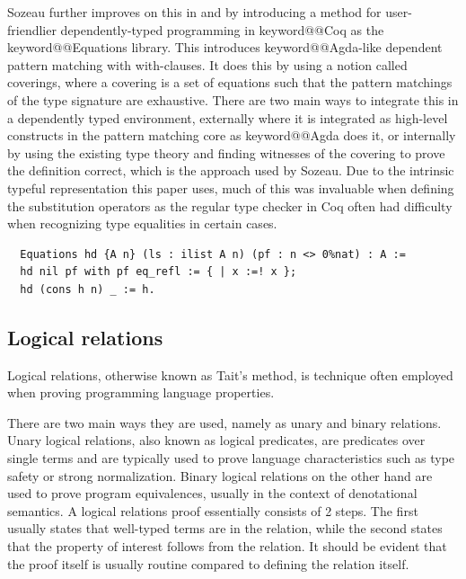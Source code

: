 \documentclass[12pt, final]{article}
\makeatletter
\def\<#1>{\csname keyword@@#1\endcsname}
\makeatother
\begin{document}
Sozeau further improves on this in \cite{Sozeau2010} and \cite{Sozeau2019} by introducing a method for user-friendlier dependently-typed programming in \<Coq> as the \<Equations> library.
This introduces \<Agda>-like dependent pattern matching with with-clauses.
It does this by using a notion called coverings, where a covering is a set of equations such that the pattern matchings of the type signature are exhaustive.
There are two main ways to integrate this in a dependently typed environment, externally where it is integrated as high-level constructs in the pattern matching core as \<Agda> does it, or internally by using the existing type theory and finding witnesses of the covering to prove the definition correct, which is the approach used by Sozeau.
Due to the intrinsic typeful representation this paper uses, much of this was invaluable when defining the substitution operators as the regular type checker in Coq often had difficulty when recognizing type equalities in certain cases.

\begin{listing}
  \begin{verbatim}
  Equations hd {A n} (ls : ilist A n) (pf : n <> 0%nat) : A :=
  hd nil pf with pf eq_refl := { | x :=! x };
  hd (cons h n) _ := h.
  \end{verbatim}
  \caption{Definition of hd using \<Equations>}
  \label{lst:dt_ilist_hd_equations}
\end{listing}


\subsection{Logical relations}

Logical relations, otherwise known as Tait's method, is technique often employed when proving programming language properties\cite{skorstengaard2019introduction}.

There are two main ways they are used, namely as unary and binary relations.
Unary logical relations, also known as logical predicates, are predicates over single terms and are typically used to prove language characteristics such as type safety or strong normalization.
Binary logical relations on the other hand are used to prove program equivalences, usually in the context of denotational semantics.
A logical relations proof essentially consists of 2 steps.
The first usually states that well-typed terms are in the relation, while the second states that the property of interest follows from the relation.
It should be evident that the proof itself is usually routine compared to defining the relation itself.
\end{document}
